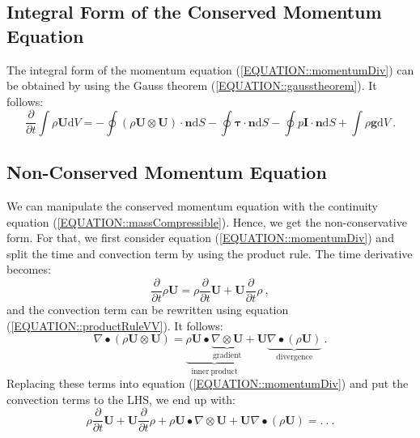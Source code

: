 \documentclass[MathematicsNumericsDerivationsAndOpenFOAM.tex]{subfiles}
\begin{document}
\subsection{Integral Form of the Conserved Momentum Equation}
%
%
    The integral form of the momentum equation (\ref{EQUATION::momentumDiv}) can
    be obtained by using the Gauss theorem (\ref{EQUATION::gausstheorem}). It
    follows:
%
%
%
\begin{equation}
 \boxed{
    \frac{\partial}{\partial t} \int \rho \textbf{U} \mathrm{d}V
=
    -   \oint (\rho\textbf{U} \otimes \textbf{U}) \cdot \textbf{n} \mathrm{d}S
    -   \oint \boldsymbol \tau  \cdot \textbf{n} \mathrm{d}S
    -   \oint p\textbf{I} \cdot \textbf{n} \mathrm{d}S
    + \int \rho\textbf{g}  \mathrm{d}V
 } ~.
\end{equation}
%
%
%
\subsection{Non-Conserved Momentum Equation}
%
%
    We can manipulate the conserved momentum equation with the continuity
    equation (\ref{EQUATION::massCompressible}). Hence, we get the
    non-conservative form. For that, we first consider equation
    (\ref{EQUATION::momentumDiv}) and split the time and convection term by
    using the product rule. The time derivative becomes:
%
%
\begin{equation}
  \frac{\partial}{\partial t} \rho \textbf{U}
=
  \rho \frac{\partial}{\partial t} \textbf{U} + \textbf{U} \frac{\partial}{\partial t} \rho ~,
\end{equation}
%
%
    and the convection term can be rewritten using equation
    (\ref{EQUATION::productRuleVV}). It follows:
%
%
\begin{equation}
  \nabla \bullet \left(\rho\textbf{U} \otimes \textbf{U}\right)
=
  \underbrace{\rho\textbf{U} \bullet \underbrace{\nabla \otimes \textbf{U}}_{\mathrm{gradient}}}_{\mathrm{inner~product}} + \textbf{U} \underbrace{\nabla \bullet (\rho\textbf{U})}_{\mathrm{divergence}} ~.
\end{equation}
%
%
    Replacing these terms into equation (\ref{EQUATION::momentumDiv}) and put
    the convection terms to the LHS, we end up with:
%
%
\begin{equation}
   \rho \frac{\partial}{\partial t} \textbf{U} + \textbf{U} \frac{\partial}{\partial t} \rho
+
   \rho\textbf{U} \bullet \nabla \otimes \textbf{U} + \textbf{U} \nabla \bullet (\rho\textbf{U})
=
   .~.~.
\end{equation}
%
\end{document}
